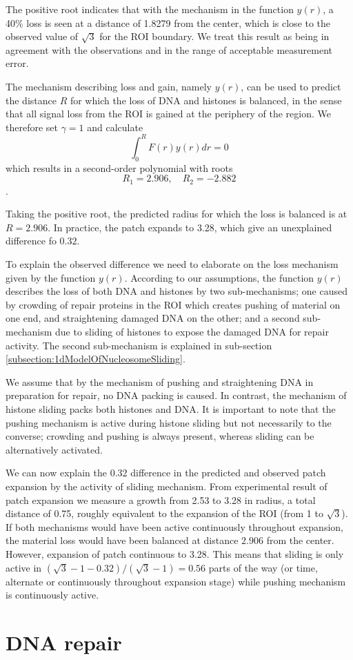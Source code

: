 \documentclass[12pt]{report}
\begin{document}
The positive root indicates that with the mechanism in the function $y(r)$, a 40\% loss is seen at a distance of 1.8279 from the center, which is close to the observed value of $\sqrt{3}$ for the ROI boundary. We treat this result as being in agreement with the observations and in the range of acceptable measurement error.

The mechanism describing loss and gain, namely $y(r)$, can be used to predict the distance $R$ for which the loss of DNA and histones is balanced, in the sense that all signal loss from the ROI is gained at the periphery of the region. We therefore set $\gamma =1$ and calculate
\begin{equation*}
\int_0^R F(r)y(r)dr = 0
\end{equation*}
which results in a second-order polynomial with roots 
\begin{equation*}
R_1=2.906, \quad R_2=-2.882
\end{equation*}.

Taking the positive root, the predicted radius for which the loss is balanced is at $R=2.906$. In practice, the patch expands to 3.28, which give an unexplained difference fo $0.32$. 

To explain the observed difference we need to elaborate on the loss mechanism given by the function $y(r)$. According to our assumptions, the function $y(r)$ describes the loss of both DNA and histones by two sub-mechanisms; one caused by crowding of repair proteins in the ROI which creates pushing of material on one end, and straightening damaged DNA on the other; and a second sub-mechanism due to sliding of histones to expose the damaged DNA for repair activity. The second sub-mechanism is explained in sub-section \ref{subsection:1dModelOfNucleosomeSliding}.  

We assume that by the mechanism of pushing and straightening DNA in preparation for repair, no DNA packing is caused. In contrast, the mechanism of histone sliding packs both histones and DNA. It is important to note that the pushing mechanism is active during histone sliding but not necessarily to the converse; crowding and pushing is always present, whereas sliding can be alternatively activated. 

We can now explain the 0.32 difference in the predicted and observed patch expansion by the activity of sliding mechanism. From experimental result of patch expansion we measure a growth from 2.53 to 3.28 in radius, a total distance of 0.75, roughly equivalent to the expansion of the ROI (from 1 to $\sqrt{3}$).
If both mechanisms would have been active continuously throughout expansion, the material loss would have been balanced at distance $2.906$ from the center. However, expansion of patch continuous to 3.28. This means that sliding is only active in $(\sqrt{3}-1-0.32)/(\sqrt{3}-1) =0.56$  parts of the way (or time, alternate or continuously throughout expansion stage) while pushing mechanism is continuously active.




 






 
\section{DNA repair}
	
\end{document}
